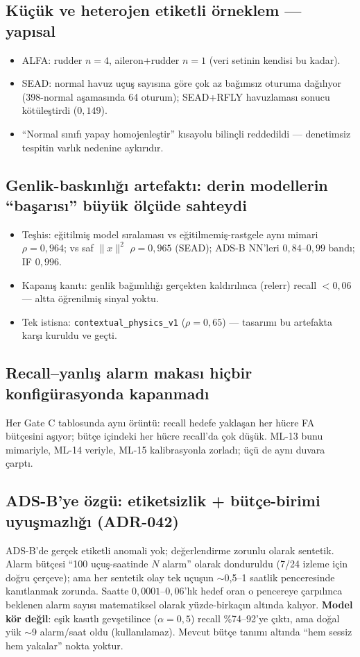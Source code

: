 \documentclass[11pt,a4paper]{article}
\newcommand{\code}[1]{\texttt{\small #1}}
\begin{document}
\subsection{Küçük ve heterojen etiketli örneklem --- yapısal}
\begin{itemize}[leftmargin=1.2em,itemsep=1pt]
  \item ALFA: rudder $n=4$, aileron+rudder $n=1$ (veri setinin kendisi bu kadar).
  \item SEAD: normal havuz uçuş sayısına göre çok az bağımsız oturuma dağılıyor
  (398-normal aşamasında 64 oturum); SEAD+RFLY havuzlaması sonucu kötüleştirdi
  ($0{,}149$).
  \item ``Normal sınıfı yapay homojenleştir'' kısayolu bilinçli reddedildi ---
  denetimsiz tespitin varlık nedenine aykırıdır.
\end{itemize}

\subsection{Genlik-baskınlığı artefaktı: derin modellerin ``başarısı'' büyük ölçüde sahteydi}
\begin{itemize}[leftmargin=1.2em,itemsep=1pt]
  \item Teşhis: eğitilmiş model sıralaması vs eğitilmemiş-rastgele aynı mimari
  $\rho = 0{,}964$; vs saf $\lVert x\rVert^2$ $\rho = 0{,}965$ (SEAD); ADS-B NN'leri
  $0{,}84$--$0{,}99$ bandı; IF $0{,}996$.
  \item Kapanış kanıtı: genlik bağımlılığı gerçekten kaldırılınca (relerr) recall
  $<0{,}06$ --- altta öğrenilmiş sinyal yoktu.
  \item Tek istisna: \code{contextual\_physics\_v1} ($\rho = 0{,}65$) --- tasarımı bu
  artefakta karşı kuruldu ve geçti.
\end{itemize}

\subsection{Recall--yanlış alarm makası hiçbir konfigürasyonda kapanmadı}
Her Gate C tablosunda aynı örüntü: recall hedefe yaklaşan her hücre FA bütçesini
aşıyor; bütçe içindeki her hücre recall'da çok düşük. ML-13 bunu mimariyle, ML-14
veriyle, ML-15 kalibrasyonla zorladı; üçü de aynı duvara çarptı.

\subsection{ADS-B'ye özgü: etiketsizlik + bütçe-birimi uyuşmazlığı (ADR-042)}
ADS-B'de gerçek etiketli anomali yok; değerlendirme zorunlu olarak sentetik.
Alarm bütçesi ``100 uçuş-saatinde $N$ alarm'' olarak donduruldu (7/24 izleme için
doğru çerçeve); ama her sentetik olay tek uçuşun $\sim$0{,}5--1 saatlik penceresinde
kanıtlanmak zorunda. Saatte $0{,}0001$--$0{,}06$'lık hedef oran o pencereye
çarpılınca beklenen alarm sayısı matematiksel olarak yüzde-birkaçın altında kalıyor.
\textbf{Model kör değil}: eşik kasıtlı gevşetilince ($\alpha = 0{,}5$) recall
\%74--92'ye çıktı, ama doğal yük $\sim$9 alarm/saat oldu (kullanılamaz). Mevcut
bütçe tanımı altında ``hem sessiz hem yakalar'' nokta yoktur.
\end{document}
